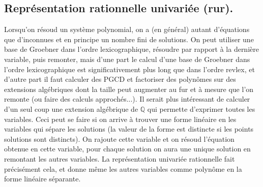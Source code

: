 \documentclass[a4paper,11pt]{article}
\newcommand{\Q}{{\mathbb{Q}}}
\begin{document}
\begin{giacjshere}


\subsection{Représentation rationnelle univariée 
(rur).}
\label{sec:rur}
Lorsqu'on résoud un système polynomial, on a (en général) autant
d'équations que d'inconnues et en principe un nombre fini de solutions.
On peut utiliser une base de Groebner dans l'ordre lexicographique,
résoudre par rapport à la dernière variable, puis remonter, mais
d'une part le calcul d'une base de Groebner dans l'ordre lexicographique
est significativement plus long que dans l'ordre revlex, et d'autre
part il faut calculer des PGCD et 
factoriser des polynômes sur des extensions algébriques
dont la taille peut augmenter au fur et à mesure que l'on remonte (ou faire
des calculs approchés...). Il serait plus intéressant de calculer
d'un seul coup une extension algébrique de $\Q$ qui permette
d'exprimer toutes les variables. Ceci peut se faire si on arrive à
trouver une forme linéaire en les variables qui sépare
les solutions (la valeur de la forme est distincte si les points
solutions sont distincts). On rajoute cette variable et on résoud
l'équation obtenue en cette variable, pour chaque solution on aura
une unique solution en remontant les autres variables. La représentation
univariée rationnelle fait précisément cela, et donne même les
autres variables comme polynôme en la forme linéaire séparante.


\end{giacjshere}
\end{document}
